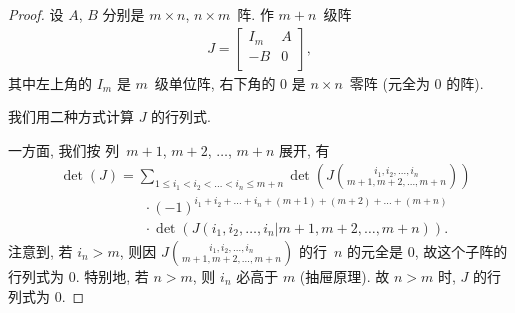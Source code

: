 \begin{proof}
    设 \(A\), \(B\) 分别是
    \(m \times n\), \(n \times m\)~阵.
    作 \(m + n\)~级阵
    \begin{align*}
        J =
        \begin{bmatrix}
            I_m & A \\
            -B  & 0 \\
        \end{bmatrix},
    \end{align*}
    其中左上角的 \(I_m\) 是 \(m\)~级单位阵,
    右下角的 \(0\) 是 \(n \times n\)~零阵
    (元全为 \(0\) 的阵).

    我们用二种方式计算 \(J\) 的行列式.

    一方面, 我们按%
    列~\(m + 1\), \(m + 2\), \(\dots\), \(m + n\) 展开,
    有
    \begin{align*}
         &
        \det {(J)}
        = \sum_{1 \leq i_1 < i_2 < \dots < i_n \leq m+n}
        {\det {\left(
                J\binom{i_1,i_2,\dots,i_n}{m+1,m+2,\dots,m+n}
                \right)}}
        \\
         &
        \qquad \qquad \qquad
        \cdot (-1)^{i_1 + i_2 + \dots + i_n
            + (m+1) + (m+2) + \dots + (m+n)}
        \\
         &
        \qquad \qquad \qquad
        \cdot \det {(J({i_1,i_2,\dots,i_n}|{m+1,m+2,\dots,m+n}))}.
    \end{align*}
    注意到, 若 \(i_n > m\), 则因
    \(\displaystyle
    J\binom{i_1,i_2,\dots,i_n}{m+1,m+2,\dots,m+n}\)
    的行~\(n\) 的元全是 \(0\),
    故这个子阵的行列式为 \(0\).
    特别地, 若 \(n > m\), 则 \(i_n\) 必高于 \(m\)
    (抽屉原理).
    故 \(n > m\) 时, \(J\) 的行列式为 \(0\).


\end{proof}
